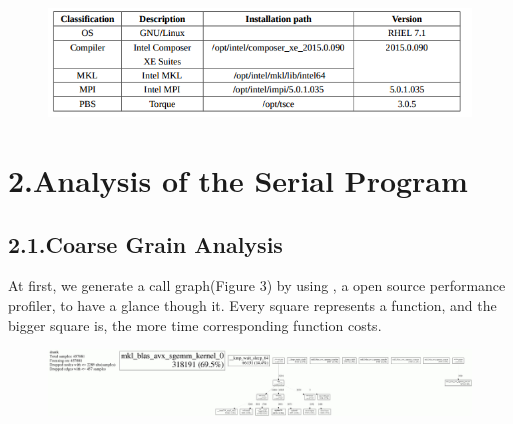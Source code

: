 \documentclass{article}
\begin{document}
\begin{figure}[tbp]%
\begin{mdcenter}%

\noindent{}\includegraphics[keepaspectratio=true,width=\dimmin{}{\dimwidth{0.90}}]{images/2016-02-18-23-13-11-}{}%

\mdhr{}%

\noindent{}%
\end{mdcenter}\label{fig-myfigure}%
\end{figure}%

\section{2.\hspace*{0.5em}Analysis of the Serial Program}\label{sec-analysis-of-the-serial-program}%

\subsection{2.1.\hspace*{0.5em}Coarse Grain Analysis}\label{sec-coarse-grain-analysis}%

\noindent{}At first, we generate a call graph(Figure 3) by using , a open source performance profiler, to have a glance though it. Every square represents a function, and the bigger square is, the more time corresponding function costs.%

\begin{figure}[tbp]%
\begin{mdcenter}%

\noindent{}\includegraphics[keepaspectratio=true,width=\dimmin{}{\dimwidth{0.90}}]{images/100001994364201}{}%

\mdhr{}%

\noindent{}%
\end{mdcenter}\label{fig-myfigure}%
\end{figure}%
\end{document}
